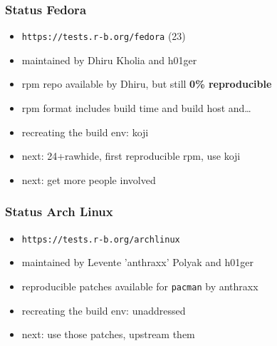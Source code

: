 \documentclass[14pt]{beamer}
\begin{document}
\begin{frame}
 \frametitle{Status Fedora}
 \begin{itemize}
  \item \texttt{https://tests.r-b.org/fedora} (23)
  \item maintained by Dhiru Kholia and h01ger
  \item rpm repo available by Dhiru, but still \textbf{0\% reproducible}
  \item rpm format includes build time and build host and…
  \item recreating the build env: koji
  \item next: 24+rawhide, first reproducible rpm, use koji
  \item next: get more people involved
 \end{itemize}
\end{frame}

\begin{frame}
 \frametitle{Status Arch Linux}
 \begin{itemize}
  \item \texttt{https://tests.r-b.org/archlinux}
  \item maintained by Levente 'anthraxx' Polyak and h01ger
  \item reproducible patches available for \texttt{pacman} by anthraxx
  \item recreating the build env: unaddressed
  \item next: use those patches, upstream them
 \end{itemize}
\end{frame}
\end{document}
